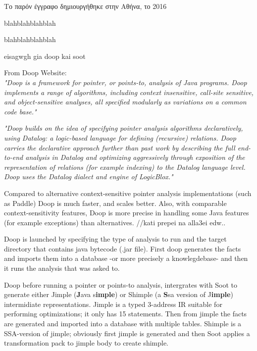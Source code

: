 \documentclass{dithesis}
\begin{document}
\begin{thesisprologue}[PROLOGUE]
    Το παρόν έγγραφο δημιουργήθηκε στην Αθήνα, το 2016 
    
    blahblahblahblah

    blahblahblahblah
\end{thesisprologue}

    eisagwgh gia doop kai soot

	From Doop Website: \\
    \textit{"Doop is a framework for pointer, or points-to, analysis of Java programs. Doop implements a range of algorithms, including context insensitive, call-site sensitive, and object-sensitive analyses, all specified modularly as variations on a common code base."}

    \textit{"Doop builds on the idea of specifying pointer analysis algorithms declaratively, using Datalog: a logic-based language for defining (recursive) relations. Doop carries the declarative approach further than past work by describing the full end-to-end analysis in Datalog and optimizing aggressively through exposition of the representation of relations (for example indexing) to the Datalog language level. Doop uses the Datalog dialect and engine of LogicBlox."} 
    
    Compared to alternative context-sensitive pointer analysis implementations (such as Paddle) Doop is much faster, and scales better. Also, with comparable context-sensitivity features, Doop is more precise in handling some Java features (for example exceptions) than alternatives. //kati prepei na alla3ei edw..

    Doop is launched by specifying the type of analysis to run and the target directory that contains java bytecode (.jar file). First doop generates the facts and imports them into a database -or more precisely a knowlegdebase- and then it runs the analysis that was asked to. \cite{Doop: Framework for Java Pointer Analysis}

        Doop before running a pointer or points-to analysis, intergrates with Soot to generate either Jimple (\textbf{J}ava s\textbf{imple}) or Shimple (a \textbf{S}sa version of J\textbf{imple}) intermidiate representations. Jimple is a typed 3-address IR suitable for performing optimizations; it only has 15 statements. Then from jimple the facts are generated and imported into a database with multiple tables. Shimple is a SSA-version of jimple; obviously first jimple is generated and then Soot applies a transformation pack to jimple body to create shimple. 
\end{document}

